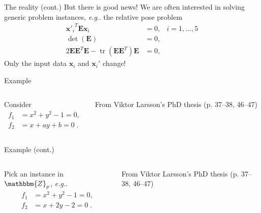 \documentclass[aspectratio=169]{beamer}
\makeatletter
\newcommand{\mat}[1]{\bm{#1}}
\newcommand{\Z}{\ensuremath{\mathbbm{Z}}}
\DeclareMathOperator{\tr}{tr}
\newcommand{\T}{T}
\DeclareRobustCommand\eg{\emph{e.g}\@ifnextchar.{}{.\@}}
\makeatother
\begin{document}
\begin{frame}{The reality (cont.)}
But there is good news!
We are often interested in solving generic problem instances, \eg{} the relative pose
problem
\begin{equation*}
\begin{aligned}
    {\mat{x}'_i}^T\mat{E}\mat{x}_i &= 0, &i=1,\ldots,5\\
    \det(\mat{E}) &= 0, &\\
    2\mat{EE}^\T\mat{E}- \tr(\mat{EE}^\T)\mat{E} &= 0, &
\end{aligned}
\end{equation*}
Only the input data $\mat{x}_i$ and $\mat{x}_i'$ change!
\end{frame}

\begin{frame}[t]{Example}
\vspace{1cm}
\begin{columns}
    \begin{column}{0.7\textwidth}
        Consider
        \begin{equation*}
        \begin{aligned}
            f_1 &= x^2+y^2-1=0, \\
            f_2 &= x + ay + b =0\;.
        \end{aligned}
        \end{equation*}
    \end{column}%
    \begin{column}{0.3\textwidth}
        \centering
        

        \vspace{5mm}

        {\scriptsize From Viktor Larsson's PhD thesis (p. 37--38, 46--47)}
    \end{column}
\end{columns}
\end{frame}

\begin{frame}[t]{Example (cont.)}
\vspace{1cm}
\begin{columns}
    \begin{column}{0.7\textwidth}
        Pick an instance in $\Z_p$, \eg{}
        \begin{equation*}
        \begin{aligned}
            f_1 &= x^2+y^2-1=0, \\
            f_2 &= x + 2y - 2 =0\;.
        \end{aligned}
        \end{equation*}
    \end{column}%
    \begin{column}{0.3\textwidth}
        \centering
        

        \vspace{5mm}

        {\scriptsize From Viktor Larsson's PhD thesis (p. 37--38, 46--47)}
    \end{column}
\end{columns}
\end{frame}
\end{document}
